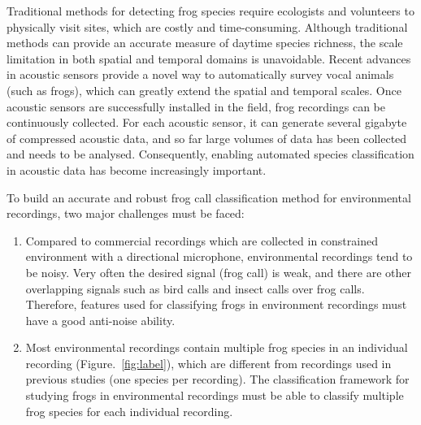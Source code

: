 Traditional methods for detecting frog species require ecologists and volunteers to physically visit sites, which are costly and time-consuming. 
Although traditional methods can provide an accurate measure of daytime species richness, the scale limitation in both spatial and temporal domains is unavoidable. Recent advances in acoustic sensors provide a novel way to automatically survey vocal animals (such as frogs), which can greatly extend the spatial and temporal scales. Once acoustic sensors are successfully installed in the field, frog recordings can be continuously collected. For each acoustic sensor, it can generate several gigabyte of compressed acoustic data, and so far large volumes of data has been collected and needs to be analysed. Consequently, enabling automated species classification in acoustic data has become increasingly important.


To build an accurate and robust frog call classification method for environmental recordings, two major challenges must be faced:

\begin{enumerate}
\item  Compared to commercial recordings which are collected in constrained environment with a directional microphone, environmental recordings tend to be noisy. Very often the desired signal (frog call) is weak, and there are other overlapping signals such as bird calls and insect calls over frog calls. Therefore, features used for classifying frogs in environment recordings must have a good anti-noise ability.


\item  Most environmental recordings contain multiple frog species in an individual recording (Figure.~\ref{fig:label}), which are different from recordings used in previous studies (one species per recording). The classification framework for studying frogs in environmental recordings must be able to classify multiple frog species for each individual recording.



\end{enumerate}
 


